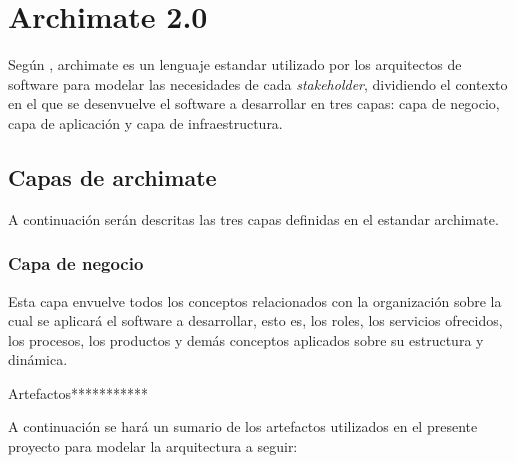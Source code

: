 \section{Archimate 2.0}

Según  \cite{archimate2}, archimate es un lenguaje estandar utilizado por los arquitectos de software para modelar las necesidades de cada \textit{stakeholder}, dividiendo el contexto en el que se desenvuelve el software a desarrollar en tres capas: capa de negocio, capa de aplicación y capa de infraestructura.

\subsection{Capas de archimate}

A continuación serán descritas las tres capas definidas en el estandar archimate.

\subsubsection{Capa de negocio}

Esta capa envuelve todos los conceptos relacionados con la organización sobre la cual se aplicará el software a desarrollar, esto es, los roles, los servicios ofrecidos, los procesos, los productos y demás conceptos aplicados sobre su estructura y dinámica.

Artefactos***********

A continuación se hará un sumario de los artefactos utilizados en el presente proyecto para modelar la arquitectura a seguir:

